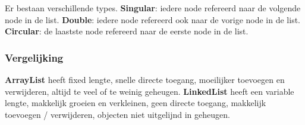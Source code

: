 Er bestaan verschillende types.
\textbf{Singular}: iedere node refereerd naar de volgende node in de list.
\textbf{Double}: iedere node refereerd ook naar de vorige node in de list.
\textbf{Circular}: de laastste node refereerd naar de eerste node in de list.

\subsubsection{Vergelijking}
\textbf{ArrayList} heeft fixed lengte, snelle directe toegang, moeilijker toevoegen en verwijderen, altijd te veel of te weinig geheugen.
\textbf{LinkedList} heeft een variable lengte, makkelijk groeien en verkleinen, geen directe toegang, makkelijk toevoegen / verwijderen, objecten niet uitgelijnd in geheugen.
